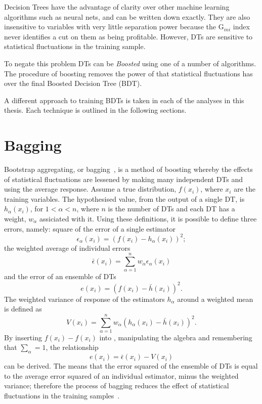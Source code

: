 Decision Trees have the advantage of clarity over other machine learning algorithms such as neural
nets, and can be written down exactly.
They are also insensitive to variables with very little separation power because the
$\mathrm{G}_{ini}$ index never identifies a cut on them as being profitable.
However, DTs are sensitive to statistical fluctuations in the training sample.

To negate this problem DTs can be \emph{Boosted} using one of a number of algorithms.
The procedure of boosting removes the power of that statistical fluctuations has over the final
Boosted Decision Tree (BDT).

A different approach to training BDTs is taken in each of the analyses in this thesis.
Each technique is outlined in the following sections.


\section{Bagging}
\label{sec:bdt:bag}
Bootstrap aggregating, or bagging~\cite{Bagging}, is a method of boosting whereby the effects of
statistical fluctuations are lessened by making many independent DTs and using the average
response.
Assume a true distribution, $f(x_i)$, where $x_i$ are the training variables.
The hypothesised value, from the output of a single DT, is $h_\alpha(x_i)$, for $1<\alpha<n$, where
$n$ is the number of DTs and each DT has a weight, $w_\alpha$ assiciated with it.
Using these definitions, it is possible to define three errors, namely:
square of the error of a single estimator
\begin{equation}
  \epsilon_\alpha(x_i) = \left(f(x_i)-h_\alpha(x_i)\right)^2;
  \label{eq:bdt:bag1}
\end{equation}
the weighted average of individual errors
\begin{equation}
  \bar\epsilon(x_i) = \sum_{\alpha=1}^nw_\alpha\epsilon_\alpha(x_i)
  \label{eq:bdt:bag2}
\end{equation}
and the error of an ensemble of DTs
\begin{equation}
  e(x_i) = \left(f(x_i)-\bar h(x_i)\right)^2.
  \label{eq:bdt:bag3}
\end{equation}
The weighted variance of response of the estimators $h_\alpha$ around a weighted mean is defined as
\begin{equation}
  V(x_i) = \sum_{\alpha=1}^nw_\alpha\left(h_\alpha(x_i) - \bar h(x_i)\right)^2.
  \label{eq:bdt:bag4}
\end{equation}
By inserting $f(x_i)-f(x_i)$ into , manipulating the algebra and remembering that
$\sum_\alpha=1$, the relationship
\begin{equation}
  e(x_i) = \bar\epsilon(x_i) - V(x_i)
  \label{eq:bdt:bag5}
\end{equation}
can be derived.
The means that the error squared of the ensemble of DTs is equal to the average error squared of an
individual estimator, minus the weighted variance; therefore the process of bagging reduces the
effect of statistical fluctuations in the training samples~\cite{Krogh95neuralnetwork}.

